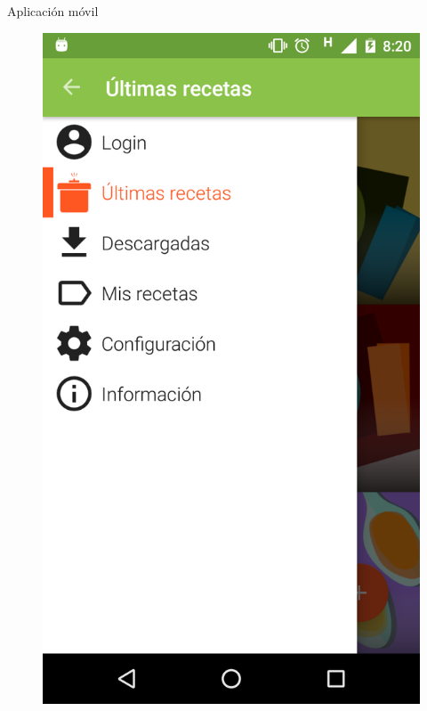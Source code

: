 \documentclass[10pt,xcolor=svgnames]{beamer}
\begin{document}
\begin{frame}{Aplicación móvil}
\begin{minipage}{\linewidth}
    \begin{minipage}{0.4\linewidth}
      \begin{figure}[H]
        \includegraphics[width=\linewidth]{img/captura_05}
      \end{figure}
    \end{minipage}
  \end{minipage}
\end{frame}
\end{document}
